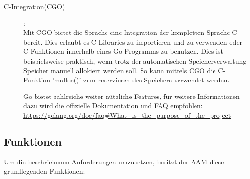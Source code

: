 \documentclass[a4paper,10pt]{scrartcl}
\begin{document}
\begin{description}
\item[C-Integration(CGO)]:\\

Mit CGO bietet die Sprache eine Integration der kompletten Sprache C bereit. Dies erlaubt es  C-Libraries zu importieren und zu verwenden oder C-Funktionen innerhalb eines Go-Programms zu benutzen. Dies ist beispielsweise praktisch, wenn trotz der automatischen Speicherverwaltung Speicher manuell allokiert werden soll. So kann mittels CGO die C-Funktion 'malloc()' zum reservieren des Speichers verwendet werden.

Go bietet zahlreiche weiter nützliche Features, für weitere Informationen dazu wird die offizielle Dokumentation und FAQ empfohlen:\\
\url{https://golang.org/doc/faq#What_is_the_purpose_of_the_project}

\end{description}

\subsection{Funktionen}

Um die beschriebenen Anforderungen umzusetzen, besitzt der AAM diese grundlegenden Funktionen:\\
\end{document}
